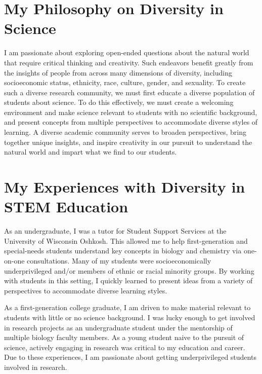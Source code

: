 \section*{My Philosophy on Diversity in Science}
I am passionate about exploring open-ended questions about the natural world
that require critical thinking and creativity.
Such endeavors benefit greatly from the insights of people from across
many dimensions of diversity,
including socioeconomic status, ethnicity, race, culture, gender, and
sexuality.
To create such a diverse research community, we must first educate a diverse
population of students about science.
To do this effectively, we must create a welcoming environment and make science
relevant to students with no scientific background, and present concepts from
multiple perspectives to accommodate diverse styles of learning.
A diverse academic community serves to broaden perspectives, bring together
unique insights, and inspire creativity in our pursuit to understand the
natural world and impart what we find to our students.

\section*{My Experiences with Diversity in STEM Education}
As an undergraduate, I was a tutor for Student Support Services at the
University of Wisconsin Oshkosh.
This allowed me to help first-generation and special-needs students understand
key concepts in biology and chemistry via one-on-one consultations.
Many of my students were socioeconomically underprivileged and/or members of
ethnic or racial minority groups.
By working with students in this setting, I quickly learned to present ideas
from a variety of perspectives to accommodate diverse learning styles.

As a first-generation college graduate, I am driven
to make material relevant to students with little or no science background.
I was lucky enough to get involved in research projects as an undergraduate
student under the mentorship of multiple biology faculty members.
As a young student naive to the pursuit of science, actively engaging in
research was critical to my education and career.
Due to these experiences, I am passionate about getting underprivileged
students involved in research.

